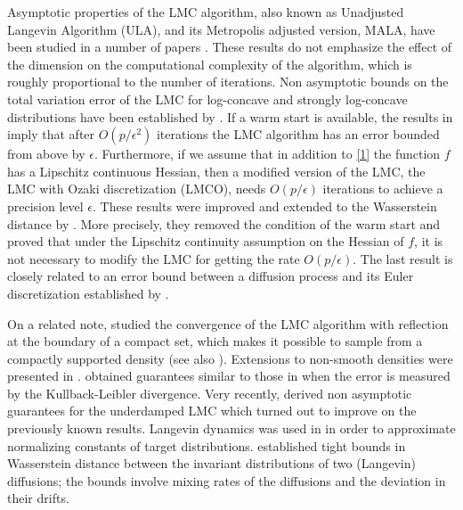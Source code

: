 \documentclass[aoap,preprint,reqno,a4paper]{imsart} %
\newcommand{\eps}{\epsilon}
\begin{document}
Asymptotic properties of the LMC algorithm, also known as Unadjusted Langevin Algorithm (ULA),
and its Metropolis adjusted version, MALA, have been studied in a number of papers
\citep{RobertsTweedie96,RobertsRosenthal98,StramerTweedie99-1,StramerTweedie99-2,Jarner2000,
RobertsStramer02}. These results do not emphasize the effect of the dimension on the computational
complexity of the algorithm, which is roughly proportional to the number of iterations.
Non asymptotic bounds on the total variation error of the LMC for log-concave and strongly
log-concave distributions have been established by \cite{Dalalyan14}. If a  warm start is
available, the results in \cite{Dalalyan14} imply that after $O(p/\eps^2)$ iterations the
LMC algorithm has an error bounded from above by $\eps$. Furthermore, if we assume that
in addition to \eqref{1} the function $f$ has a Lipschitz continuous Hessian, then a modified
version of the LMC, the LMC with Ozaki discretization (LMCO), needs $O(p/\eps)$ iterations
to achieve a precision level $\eps$. These results were improved and extended to the Wasserstein
distance by \citep{durmus2017,Durmus2}. More precisely, they removed the condition of the warm
start and proved that under the Lipschitz continuity assumption on the Hessian of $f$, it is
not necessary to modify the LMC for getting the rate $O(p/\eps)$. The last result is closely
related to an error bound between a diffusion process and its Euler discretization established
by \cite{alfonsi2014}.

On a related note, \citep{Bubeck18} studied the convergence of the LMC algorithm with reflection
at the boundary of a compact set, which makes it possible to sample from a compactly supported
density (see also \citep{brosse17a}). Extensions to non-smooth densities were presented in
\citep{Durmus3,Luu}. \citep{Cheng1} obtained guarantees similar to those in \citep{Dalalyan14}
when the error is measured by the Kullback-Leibler divergence. Very recently, \citep{Cheng2}
derived non asymptotic guarantees for the underdamped LMC which turned out to improve on the
previously known results. Langevin dynamics was used in \citep{Ridgway16,Brosse17b} in order to
approximate normalizing constants of target distributions. \cite{huggins17a} established tight
bounds in Wasserstein distance between the invariant distributions of two (Langevin) diffusions;
the bounds involve mixing rates of the diffusions and the deviation in their drifts.
\end{document}
